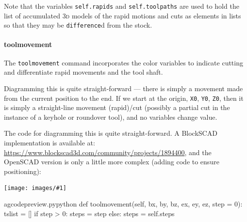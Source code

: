 \documentclass{ltxdoc}
\newcommand{\includeimage}[1]{\bigskip\noindent\texttt{[image: images/\#1]}\bigskip}
\begin{document}
Note that the variables \verb|self.rapids| and \verb|self.toolpaths| are used to hold the list of accumulated \textsc{3d} models of the rapid motions and cuts as elements in lists so that they may be \verb|difference|d from the stock.


\paragraph{toolmovement}

The \verb|toolmovement| command incorporates the color variables to indicate cutting and differentiate rapid movements and the tool shaft.

Diagramming this is quite straight-forward --- there is simply a movement made from the current position to the end. If we start at the origin, \verb|X0|, \verb|Y0|, \verb|Z0|, then it is simply a straight-line movement (rapid)/cut (possibly a partial cut in the instance of a keyhole or roundover tool), and no variables change value.

The code for diagramming this is quite straight-forward. A BlockSCAD implementation is available at: \url{https://www.blockscad3d.com/community/projects/1894400}, and the OpenSCAD version is only a little more complex (adding code to ensure positioning):

\includeimage{gcp_statemachine_0_0_0_50_25_-10.png}%


\lstset{firstnumber=\thegcpy}
\begin{writecode}{a}{gcodepreview.py}{python}
    def toolmovement(self, bx, by, bz, ex, ey, ez, step = 0):
        tslist = []
        if step > 0:
            steps = step
        else:
            steps = self.steps

\end{writecode}
\addtocounter{gcpy}{23}
\end{document}
